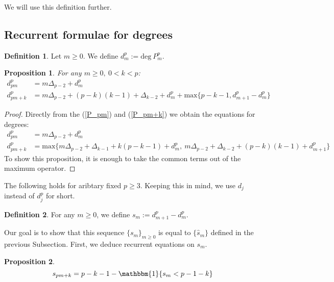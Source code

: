 \documentclass[a4paper]{article}
\theoremstyle{plain}
\newtheorem{proposition}{Proposition}[section]
\theoremstyle{definition}
\newtheorem{definition}{Definition}
\begin{document}
We will use this definition further.

\subsection{Recurrent formulae for degrees}
\begin{definition}
Let $m \ge 0$. We define $d_m^p := \mathrm{deg}\ P_m^p$.
\end{definition}
\begin{proposition} \label{dm_eq}
For any $m \ge 0,\ 0 < k < p$:
\begin{align*}
  d_{pm}^p &= m \Delta_{p-2} + d_m^p \\
  d_{pm+k}^p &= m \Delta_{p-2}+(p-k)(k-1)+\Delta_{k-2}+d_m^p + \mathrm{max}\{p-k-1, d_{m+1}^p-d_m^p\}
\end{align*}
\end{proposition}
\begin{proof}
Directly from the (\ref{P_pm}) and (\ref{P_pm+k}) we obtain the equations for degrees:
\begin{align*}
  d_{pm}^p &= m \Delta_{p-2} + d_m^p \\
  d_{pm+k}^p &= \mathrm{max}\{ m\Delta_{p-2} + \Delta_{k-1} + k(p-k-1) + d_m^p,\     
                                m\Delta_{p-2} + \Delta_{k-2} + (p-k)(k-1) + d_{m+1}^p \}
\end{align*}
To show this proposition, it is enough to take the common terms out of the maximum operator.
\end{proof}
The following holds for aribtary fixed $p \ge 3$. Keeping this in mind, we use $d_j$ instead of $d_j^p$ for short.
\begin{definition} \label{sm_def}
For any $m \ge 0$, we define $s_m := d_{m+1}^p - d_m^p $.
\end{definition}
Our goal is to show that this sequence $\{s_m\}_{m \ge 0}$ is equal to $\{\hat{s}_m\}$ defined in the previous Subsection. First, we deduce recurrent equations on $s_m$.
\begin{proposition}
\begin{equation} \label{sm_eq}
s_{pm+k} = p-k-1 - \mathbbm{1}\{s_m < p-1-k\}
\end{equation}
\end{proposition}
\end{document}
